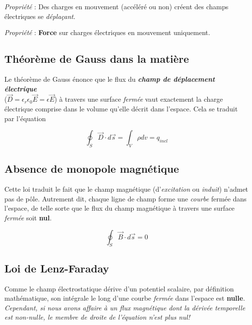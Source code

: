 \textit{Propriété} : Des charges en mouvement (accéléré ou non) créent des champs électriques se \textit{déplaçant}.

\textit{Propriété} : \textbf{Force} sur charges électriques en mouvement uniquement.


\subsection{Théorème de Gauss dans la matière}

Le théorème de Gauss énonce que le flux du \textit{\textbf{champ de déplacement électrique}} \\($\vec{D} = \epsilon_{r}\epsilon_{0}\vec{E} = \epsilon \vec{E}$)
à travers une surface \textit{fermée} vaut exactement la charge électrique comprise dans le volume qu'elle décrit dans l'espace. Cela se traduit par l'équation 

\begin{equation}
 \oint_{S} \vec{D} \cdot d\vec{s} = \int_{V} \rho dv = q_{incl}
 \label{GaussIntegral}
\end{equation}

\subsection{Absence de monopole magnétique}

Cette loi traduit le fait que le champ magnétique (d'\textit{excitation} ou \textit{induit}) n'admet pas de pôle. 
Autrement dit, chaque ligne de champ forme une \textit{courbe} fermée dans l'espace, de telle sorte que le flux 
du champ magnétique à travers une surface \textit{fermée} soit \textbf{nul}.

\begin{equation}
 \oint_{S} \vec{B} \cdot d\vec{s} = 0
 \label{MonoPoleIntegral}
\end{equation}

\subsection{Loi de Lenz-Faraday}

Comme le champ électrostatique dérive d'un potentiel scalaire, par définition mathématique, son intégrale le long 
d'une courbe \textit{fermée} dans l'espace est \textbf{nulle}. %
\textit{Cependant, si nous avons affaire à un flux magnétique dont la dérivée temporelle est non-nulle, le membre de droite de l'équation n'est plus nul!}

